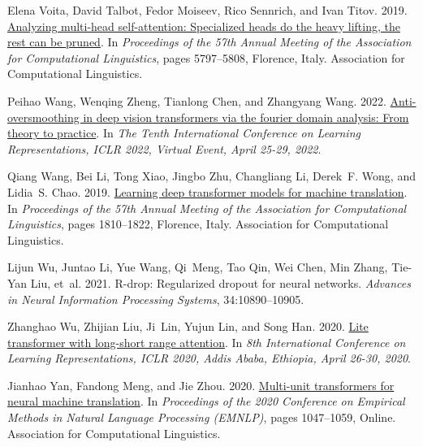 \documentclass[11pt]{article}
\begin{document}
\begin{thebibliography}{49}
Elena Voita, David Talbot, Fedor Moiseev, Rico Sennrich, and Ivan Titov. 2019.
\newblock \href {https://doi.org/10.18653/v1/P19-1580} {Analyzing multi-head self-attention: Specialized heads do the heavy lifting, the rest can be pruned}.
\newblock In \emph{Proceedings of the 57th Annual Meeting of the Association for Computational Linguistics}, pages 5797--5808, Florence, Italy. Association for Computational Linguistics.

Peihao Wang, Wenqing Zheng, Tianlong Chen, and Zhangyang Wang. 2022.
\newblock \href {https://openreview.net/forum?id=O476oWmiNNp} {Anti-oversmoothing in deep vision transformers via the fourier domain analysis: From theory to practice}.
\newblock In \emph{The Tenth International Conference on Learning Representations, {ICLR} 2022, Virtual Event, April 25-29, 2022}.

Qiang Wang, Bei Li, Tong Xiao, Jingbo Zhu, Changliang Li, Derek~F. Wong, and Lidia~S. Chao. 2019.
\newblock \href {https://doi.org/10.18653/v1/P19-1176} {Learning deep transformer models for machine translation}.
\newblock In \emph{Proceedings of the 57th Annual Meeting of the Association for Computational Linguistics}, pages 1810--1822, Florence, Italy. Association for Computational Linguistics.

Lijun Wu, Juntao Li, Yue Wang, Qi~Meng, Tao Qin, Wei Chen, Min Zhang, Tie-Yan Liu, et~al. 2021.
\newblock R-drop: Regularized dropout for neural networks.
\newblock \emph{Advances in Neural Information Processing Systems}, 34:10890--10905.

Zhanghao Wu, Zhijian Liu, Ji~Lin, Yujun Lin, and Song Han. 2020.
\newblock \href {https://openreview.net/forum?id=ByeMPlHKPH} {Lite transformer with long-short range attention}.
\newblock In \emph{8th International Conference on Learning Representations, {ICLR} 2020, Addis Ababa, Ethiopia, April 26-30, 2020}.

Jianhao Yan, Fandong Meng, and Jie Zhou. 2020.
\newblock \href {https://doi.org/10.18653/v1/2020.emnlp-main.77} {Multi-unit transformers for neural machine translation}.
\newblock In \emph{Proceedings of the 2020 Conference on Empirical Methods in Natural Language Processing (EMNLP)}, pages 1047--1059, Online. Association for Computational Linguistics.


\end{thebibliography}
\end{document}
